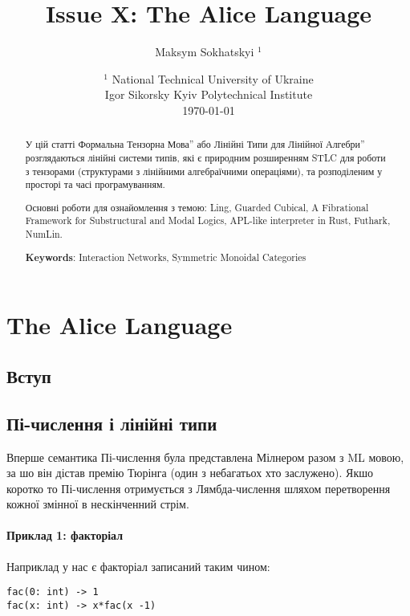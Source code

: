 \documentclass{article}
\begin{document}
\title{Issue X: The Alice Language}
\author{Maksym Sokhatskyi $^1$}
\date{ $^1$ National Technical University of Ukraine \\
       \small Igor Sikorsky Kyiv Polytechnical Institute \\
       \today }

\maketitle

\begin{abstract}

У цій статті Формальна Тензорна Мова'' або Лінійні Типи для Лінійної Алгебри''
розглядаються лінійні системи типів,
які є природним розширенням STLC для роботи з тензорами (структурами з лінійними алгебраїчними операціями),
та розподіленим у просторі та часі програмуванням.

Основні роботи для ознайомлення з темою: Ling, Guarded Cubical,
A Fibrational Framework for Substructural and Modal Logics,
APL-like interpreter in Rust, Futhark, NumLin.

{\bf Keywords}: Interaction Networks, Symmetric Monoidal Categories
\end{abstract}

\ifincludeTOC
  \tableofcontents
\fi

\newpage

\section{The Alice Language}

\subsection{Вступ}

\subsection{Пі-числення і лінійні типи}
Вперше семантика Пі-числення була представлена Мілнером разом з ML мовою,
за шо він дістав премію Тюрінга (один з небагатьох хто заслужено).
Якшо коротко то Пі-числення отримується з Лямбда-числення шляхом перетворення
кожної змінної в нескінченний стрім.

\paragraph{Приклад 1: факторіал}
Наприклад у нас є факторіал записаний таким чином:
\begin{lstlisting}
fac(0: int) -> 1
fac(x: int) -> x*fac(x -1)
\end{lstlisting}
\end{document}
